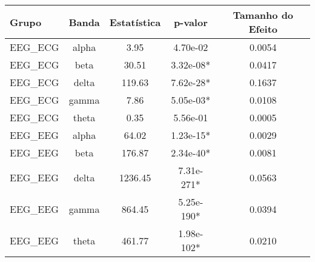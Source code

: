 \begin{tabular}{lcccc}
\toprule
Grupo & Banda & Estatística & p-valor & Tamanho do Efeito \\
\midrule
EEG_ECG & alpha & 3.95 & 4.70e-02 & 0.0054 \\
EEG_ECG & beta & 30.51 & 3.32e-08* & 0.0417 \\
EEG_ECG & delta & 119.63 & 7.62e-28* & 0.1637 \\
EEG_ECG & gamma & 7.86 & 5.05e-03* & 0.0108 \\
EEG_ECG & theta & 0.35 & 5.56e-01 & 0.0005 \\
EEG_EEG & alpha & 64.02 & 1.23e-15* & 0.0029 \\
EEG_EEG & beta & 176.87 & 2.34e-40* & 0.0081 \\
EEG_EEG & delta & 1236.45 & 7.31e-271* & 0.0563 \\
EEG_EEG & gamma & 864.45 & 5.25e-190* & 0.0394 \\
EEG_EEG & theta & 461.77 & 1.98e-102* & 0.0210 \\
\bottomrule
\end{tabular}